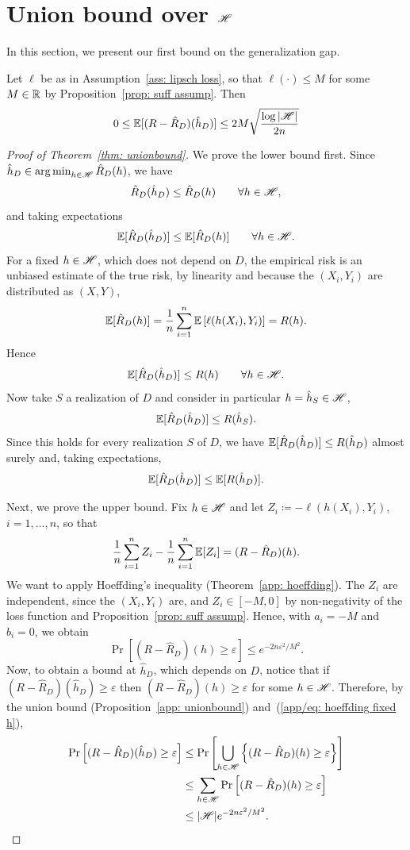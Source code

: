 \documentclass[reqno]{amsart}
\let\oldsection\section
\renewcommand{\section}{\clearpage\thispagestyle{plain}\oldsection}
\begin{document}
\section{Union bound over $\mathscr{H}$}\label{sec: unionbound}

In this section, we present our first bound on the generalization gap.

\begin{theorem}\label{thm: unionbound} Let $\ell$ be as in Assumption~\ref{ass: lipsch loss}, so that $\ell(\cdot) \le M$ for some $M\in\mathbb{R}$ by Proposition~\ref{prop: suff assump}. Then
\[                
  0 \le \mathbb{E}[(R - \hat R_D)(\hat h_D)] \le 2M\sqrt{\frac{\log \vert \mathscr{H} \vert}{2n}}
\]
\begin{proof}[Proof of Theorem~\ref{thm: unionbound}]
We prove the lower bound first. Since $\hat h_D \in \operatorname*{arg\,min}_{h\in\mathscr{H}} \hat R_D(h)$, we have
\[
\hat R_D(\hat h_D) \le \hat R_D(h) \qquad \forall h\in\mathscr{H},
\]
and taking expectations
\[
\mathbb{E}[\hat R_D(\hat h_D)] \le \mathbb{E}[\hat R_D(h)] \qquad \forall h\in\mathscr{H}.
\]
For a fixed $h\in\mathscr{H}$, which does not depend on $D$, the empirical risk is an unbiased estimate of the true risk, by linearity and because the $(X_i,Y_i)$ are distributed as $(X,Y)$,
\[
\mathbb{E}[\hat R_D(h)] = \frac1n\sum_{i=1}^n \mathbb{E}\left[\ell(h(X_i),Y_i)\right] = R(h).
\]
Hence
\[
\mathbb{E}[\hat R_D(\hat h_D)] \le R(h) \qquad \forall h\in\mathscr{H}.
\]
Now take $S$ a realization of $D$ and consider in particular $h=\hat h_{S}\in\mathscr{H}$,
\[
\mathbb{E}[\hat R_D(\hat h_D)] \le R(\hat h_{S}).
\]
Since this holds for every realization $S$ of $D$, we have $\mathbb{E}[\hat R_D(\hat h_D)] \le R(\hat h_D)$ almost surely and, taking expectations,
\[
\mathbb{E}[\hat R_D(\hat h_D)] \le \mathbb{E}[R(\hat h_D)].
\]

Next, we prove the upper bound. Fix $h\in\mathscr{H}$ and let $Z_i \coloneq -\ell(h(X_i),Y_i)$, $i=1,\ldots,n$, so that
\[
\frac1n\sum_{i=1}^n Z_i - \frac1n\sum_{i=1}^n \mathbb{E}[Z_i] = (R - \hat R_D)(h).
\]
We want to apply Hoeffding's inequality (Theorem~\ref{app: hoeffding}). The $Z_i$ are independent, since the $(X_i,Y_i)$ are, and $Z_i\in[-M,0]$ by non-negativity of the loss function and Proposition~\ref{prop: suff assump}. Hence, with $a_i = -M$ and $b_i = 0$, we obtain
\begin{equation}\label{app/eq: hoeffding fixed h}
\Pr\left[(R - \hat R_D)(h) \ge \varepsilon\right] \le e^{-2n\varepsilon^2/M^2}.
\end{equation}
Now, to obtain a bound at $\hat h_D$, which depends on $D$, notice that if $(R-\hat R_D)(\hat h_D)\ge\varepsilon$ then $(R - \hat R_D)(h)\ge\varepsilon$ for some $h\in\mathscr{H}$. Therefore, by the union bound (Proposition~\ref{app: unionbound}) and~(\ref{app/eq: hoeffding fixed h}),
\begin{align}\label{app/eq: unionbound prob}
\Pr\left[(R-\hat R_D)(\hat h_D) \ge \varepsilon\right] &\le \Pr\left[\bigcup_{h\in\mathscr{H}}\left\{(R - \hat R_D)(h)\ge\varepsilon\right\}\right] \notag \\
&\le \sum_{h\in\mathscr{H}} \Pr\left[(R - \hat R_D)(h)\ge \varepsilon\right] \notag \\
&\le \vert\mathscr{H}\vert e^{-2n\varepsilon^2/M^2}.
\end{align}


\end{proof}
\end{theorem}
\end{document}

